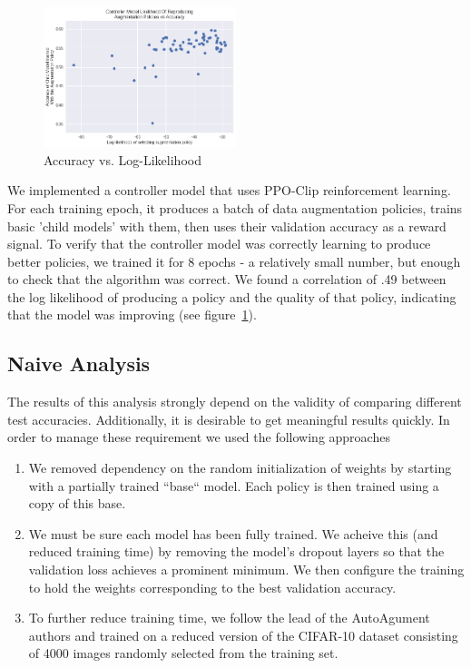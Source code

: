 \documentclass[10pt,twocolumn,letterpaper]{article}
\begin{document}
\begin{figure}[h]		
\begin{center}
\includegraphics[width=0.5\textwidth]{ReducedAutoAugment.png}
\end{center}
\caption{Accuracy vs. Log-Likelihood}
\label{fig:RAA}
\end{figure}
		We implemented a controller model that uses PPO-Clip reinforcement learning. For each training epoch, it produces a batch of data augmentation policies, trains basic 'child models' with them, then uses their validation accuracy as a reward signal. To verify that the controller model was correctly learning to produce better policies, we trained it for 8 epochs - a relatively small number, but enough to check that the algorithm was correct. We found a correlation of .49 between the log likelihood of producing a policy and the quality of that policy, indicating that the model was improving (see figure~\ref{fig:RAA}).
		
	
	\subsection{Naive Analysis}
		
		The results of this analysis strongly depend on the validity of comparing different test accuracies. Additionally, it is desirable to get meaningful results quickly. In order to manage these requirement we used the following approaches
		
		\begin{enumerate}
			\item
				We removed dependency on the random initialization of weights by starting with a partially trained ``base`` model. Each policy is then trained using a copy of this base.
				
			\item 
				We must be sure each model has been fully trained. We acheive this (and reduced training time) by removing the model's dropout layers so that the validation loss achieves a prominent minimum. We then configure the training to hold the weights corresponding to the best validation accuracy.
				
			\item 
				To further reduce training time, we follow the lead of the AutoAgument authors and trained on a reduced version of the CIFAR-10 dataset consisting of 4000 images randomly selected from the training set.
		\end{enumerate}
\end{document}
